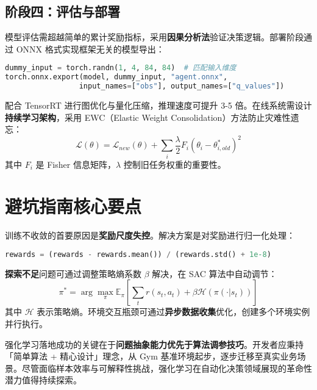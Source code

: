 \section{阶段四：评估与部署}
模型评估需超越简单的累计奖励指标，采用\textbf{因果分析法}验证决策逻辑。部署阶段通过 ONNX 格式实现框架无关的模型导出：\par
\begin{lstlisting}[language=python]
dummy_input = torch.randn(1, 4, 84, 84)  # 匹配输入维度
torch.onnx.export(model, dummy_input, "agent.onnx", 
                 input_names=["obs"], output_names=["q_values"])
\end{lstlisting}
配合 TensorRT 进行图优化与量化压缩，推理速度可提升 3-5 倍。在线系统需设计\textbf{持续学习架构}，采用 EWC（Elastic Weight Consolidation）方法防止灾难性遗忘：
$$ \mathcal{L}(\theta) = \mathcal{L}_{new}(\theta) + \sum_i \frac{\lambda}{2} F_i (\theta_i - \theta_{i,old}^*)^2 $$
其中 $F_i$ 是 Fisher 信息矩阵，$\lambda$ 控制旧任务权重的重要性。\par
\chapter{避坑指南核心要点}
训练不收敛的首要原因是\textbf{奖励尺度失控}。解决方案是对奖励进行归一化处理：\par
\begin{lstlisting}[language=python]
rewards = (rewards - rewards.mean()) / (rewards.std() + 1e-8)
\end{lstlisting}
\textbf{探索不足}问题可通过调整策略熵系数 $\beta$ 解决，在 SAC 算法中自动调节：
$$ \pi^* = \arg\max_\pi \mathbb{E}_\pi \left[ \sum_t r(s_t,a_t) + \beta \mathcal{H}(\pi(\cdot|s_t)) \right] $$
其中 $\mathcal{H}$ 表示策略熵。环境交互瓶颈可通过\textbf{异步数据收集}优化，创建多个环境实例并行执行。\par
强化学习落地成功的关键在于\textbf{问题抽象能力优先于算法调参技巧}。开发者应秉持「简单算法 + 精心设计」理念，从 Gym 基准环境起步，逐步迁移至真实业务场景。尽管面临样本效率与可解释性挑战，强化学习在自动化决策领域展现的革命性潜力值得持续探索。\par
